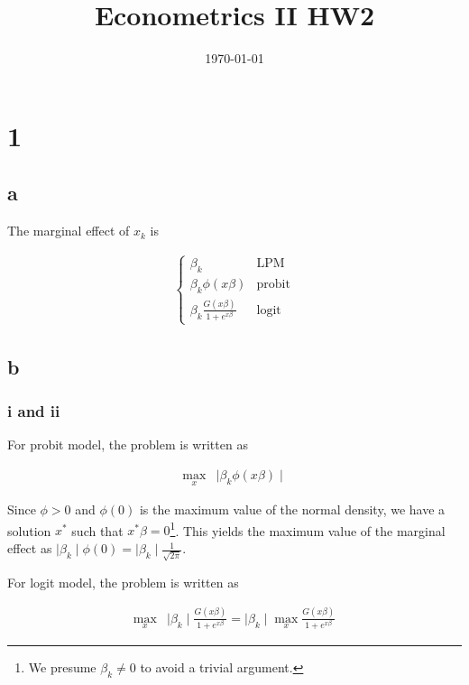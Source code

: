 \documentclass[11pt]{article}
\begin{document}
\title{Econometrics II HW2} %
\author{}  %
\date{\today}

\maketitle

\pagebreak

\section*{1}

\subsection*{a}

The marginal effect of $x_k$ is

\begin{align*}
    \begin{cases}{}
        \beta_k & \text{LPM} \\
        \beta_k \phi(x\beta) & \text{probit} \\
        \beta_k \frac{G(x\beta)}{1 + e^{x\beta}} & \text{logit}
    \end{cases}
\end{align*}

\subsection*{b}
\subsubsection*{i and ii}

For probit model, the problem is written as

\begin{align*}
    \max_{x}&  \mid \beta_k \phi(x\beta) \mid
\end{align*}

Since $\phi > 0$ and $\phi(0)$ is the maximum value of the normal density, we have a solution $x^*$ such that $x^* \beta = 0$\footnote{We presume $\beta_k \neq 0$ to avoid a trivial argument.}. This yields the maximum value of the marginal effect as $\mid \beta_k \mid \phi(0) = \mid \beta_k \mid \frac{1}{\sqrt{2\pi}}$.

For logit model, the problem is written as

\begin{align*}
    \max_{x}&  \mid \beta_k \mid\frac{G(x\beta)}{1 + e^{x\beta}}
    = \mid \beta_k \mid \max_{x} \frac{G(x\beta)}{1 + e^{x\beta}}
\end{align*}
\end{document}
